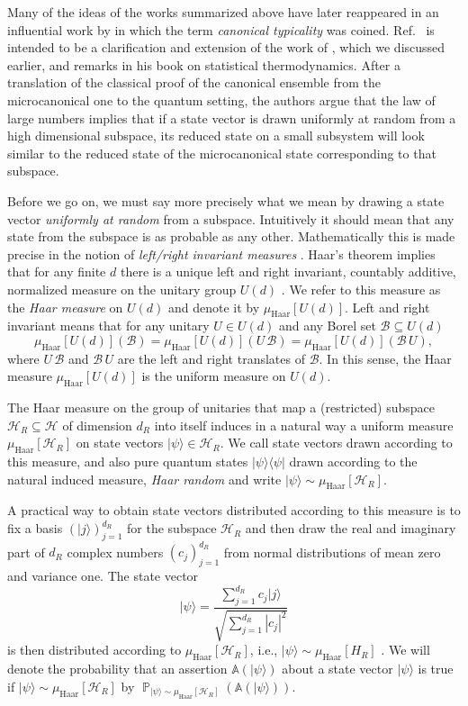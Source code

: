 \documentclass[a4paper,12pt,listof=totoc,index=totoc,bibliography=totoc,headsepline=false,headings=normal,BCOR16.153846mm,DIV12,headinclude,twoside,cleardoublepage=empty,numbers=noenddot,final]{scrreprt}
\theoremstyle{mystyle}
\numberwithin{equation}{section}
\numberwithin{figure}{section}
\numberwithin{lemma}{section}
\numberwithin{theorem}{section}
\numberwithin{corollary}{section}
\numberwithin{definition}{section}
\numberwithin{conjecture}{section}
\numberwithin{observation}{section}
\newcommand{\+}{\mkern2mu}
\newcommand{\muhaar}{\mu_{\mathrm{Haar}}}
\newcommand{\bra}[1]{\langle #1|}
\newcommand{\ket}[1]{|#1\rangle}
\newcommand{\ketbra}[2]{\ket{#1}\!\bra{#2}}
\DeclareMathOperator*{\probability}{\mathbb{P}}
\DeclareMathOperator{\1}{\mathds{1}}
\newcommand{\mc}[1]{\mathcal{#1}}
\newcommand{\mcH}{\mc{H}}
\begin{document}
Many of the ideas of the works summarized above have later reappeared in an influential work by \textcite{Goldstein06} in which the term \emph{canonical typicality} was coined.
Ref.~\cite{Goldstein06} is intended to be a clarification and extension of the work of \textcite{Schroedinger1927}, which we discussed earlier, and remarks in his book \cite{Schroedinger1952} on statistical thermodynamics.
After a translation of the classical proof of the canonical ensemble from the microcanonical one to the quantum setting, the authors argue that the law of large numbers implies that if a state vector is drawn uniformly at random from a high dimensional subspace, its reduced state on a small subsystem will look similar to the reduced state of the microcanonical state corresponding to that subspace.

Before we go on, we must say more precisely what we mean by drawing a state vector \emph{uniformly at random} from a subspace.
Intuitively it should mean that any state from the subspace is as probable as any other.
Mathematically this is made precise in the notion of \emph{left/right invariant measures} \cite{halmos}.
Haar's theorem \cite{Haar1933} implies that for any finite $d$ there is a unique left and right invariant, countably additive, normalized measure on the unitary group $U(d)$ \cite{halmos}.
We refer to this measure as the \emph{Haar measure} on $U(d)$ and denote it by $\muhaar[U(d)]$.
Left and right invariant means that for any unitary $U \in U(d)$ and any Borel set $\mathscr{B}\subseteq U(d)$
\begin{equation}
  \muhaar[U(d)](\mathscr{B}) = \muhaar[U(d)](U\,\mathscr{B}) = \muhaar[U(d)](\mathscr{B}\,U) ,
\end{equation}
where $U\,\mathscr{B}$ and $\mathscr{B}\,U$ are the left and right translates of $\mathscr{B}$.
In this sense, the Haar measure $\muhaar[U(d)]$ is the uniform measure on $U(d)$.

The Haar measure on the group of unitaries that map a (restricted) subspace $\mcH_R \subseteq \mcH$ of dimension $d_R$ into itself induces in a natural way a uniform measure $\muhaar[\mcH_R]$ on state vectors $\ket\psi\in\mcH_R$.
We call state vectors drawn according to this measure, and also pure quantum states $\ketbra \psi \psi$ drawn according to the natural induced measure, \emph{Haar random} and write $\ket\psi \sim \muhaar[\mcH_R]$.

A practical way to obtain state vectors distributed according to this measure is to fix a basis $(\ket{j})_{j=1}^{d_R}$ for the subspace $\mcH_R$ and then draw the real and imaginary part of $d_R$ complex numbers $(c_j)_{j=1}^{d_R}$ from normal distributions of mean zero and variance one.
The state vector
\begin{equation} \label{eq:normalizedstateintermsofcoefficients}
  \ket{\psi} = \frac{\sum_{j=1}^{d_R} c_j \ket{j}}{\sqrt{\sum_{j=1}^{d_R} |c_j|^2}}
\end{equation}
is then distributed according to $\muhaar[\mcH_R]$, i.e., $\ket\psi \sim \muhaar[H_R]$ \cite{Zyczkowski2001}.
We will denote the probability that an assertion $\mathbb{A}(\ket{\psi})$ about a state vector $\ket\psi$ is true if $\ket\psi \sim \muhaar[\mcH_R]$ by $\probability_{\ket\psi \sim \muhaar[\mcH_R]}(\mathbb{A}(\ket\psi))$.
\end{document}
